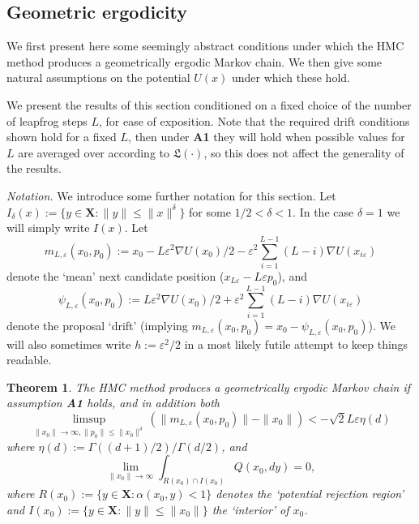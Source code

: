 \documentclass[bj,numbers,noshowframe]{imsart}
\newcommand{\X}{\mathbf{X}}
\newcommand{\e}{\varepsilon}
\theoremstyle{definition}
\theoremstyle{plain}
\newtheorem{thm}[defn]{Theorem}
\theoremstyle{definition}
\begin{document}
\subsection{Geometric ergodicity}  

We first present here some seemingly abstract conditions under which the HMC method produces a geometrically ergodic Markov chain.  We then give some natural assumptions on the potential $U(x)$ under which these hold.

We present the results of this section conditioned on a fixed choice of the number of leapfrog steps $L$, for ease of exposition.  Note that the required drift conditions shown hold for a fixed $L$, then under \textbf{A1} they will hold when possible values for $L$ are averaged over according to $\mathfrak{L}(\cdot)$, so this does not affect the generality of the results.

\textit{Notation.} We introduce some further notation for this section. Let $I_\delta(x) := \{ y \in \X : \|y\| \leq \|x\|^\delta \}$ for some $1/2 < \delta < 1$. In the case $\delta=1$ we will simply write $I(x)$.  Let
\[
m_{L,\e}(x_0,p_0) := x_0 - L\e^2\nabla U(x_0)/2 - \e^2\sum_{i=1}^{L-1} (L-i)\nabla U(x_{i\e})
\]
denote the `mean' next candidate position ($x_{L\e}-L\e p_0$), and 
\[
\psi_{L,\e}(x_0,p_0):= L\e^2\nabla U(x_0)/2 + \e^2\sum_{i=1}^{L-1} (L-i)\nabla U(x_{i\e})
\]
denote the proposal `drift' (implying $m_{L,\e}(x_0,p_0) = x_0 - \psi_{L,\e}(x_0,p_0)$).  We will also sometimes write $h:=\e^{2}/2$
in a most likely futile attempt to keep things readable.

\begin{thm} \label{thm:geoerg} The HMC method produces a geometrically ergodic Markov chain if assumption \textbf{A1} holds, and in addition both
\begin{equation} \label{eqn:mean}
\limsup_{\|x_0\|\to\infty, \|p_0\| \leq \|x_0\|^\delta} \left( \|m_{L,\e}(x_0,p_0)\| - \|x_0\| \right) < -\sqrt{2}L\e\eta(d)
\end{equation}
where $\eta(d):=\Gamma((d+1)/2)/\Gamma(d/2)$, and
\begin{equation} \label{eqn:inwards}
\lim_{\|x_0\|\to\infty} \int_{R(x_0) \cap I(x_0)} Q(x_0,dy) = 0,
\end{equation}
where $R(x_0) := \{ y \in \X : \alpha(x_0,y) < 1 \}$ denotes the `potential rejection region' and $I(x_0) := \{ y \in \X : \|y\| \leq \|x_0\| \}$ the `interior' of $x_0$.
\end{thm}
\end{document}
